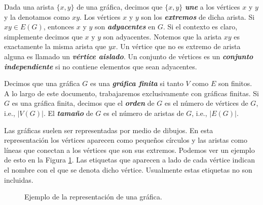 Dada una arista $\{x,y\}$ de una gráfica, decimos que $\{x,y\}$ \textbf{\emph{une}} a los vértices $x$ y $y$ y la denotamos como $xy$. Los vértices $x$ y $y$ son los \textbf{\emph{extremos}} de dicha arista. Si $xy \in E(G)$, entonces $x$ y $y$ son \textbf{\emph{adyacentes}} en $G$. Si el contexto es claro, simplemente decimos que $x$ y $y$ son adyacentes. Notemos que la arista $xy$ es exactamente la misma arista que $yx$. Un vértice que no es extremo de arista alguna es llamado un \textbf{\emph{vértice aislado}}. Un conjunto de vértices es un \textbf{\emph{conjunto independiente}} si no contiene elementos que sean adyacentes.

Decimos que una gráfica $G$ es una \textbf{\textit{gráfica finita}} si tanto $V$ como $E$ son finitos. A lo largo de este documento, trabajaremos exclusivamente con gráficas finitas. Si $G$ es una gráfica finita, decimos que el \textbf{\emph{orden}} de $G$ es el número de vértices de $G$, i.e., $|V(G)|$. El \textbf{\emph{tamaño}} de $G$ es el número de aristas de $G$, i.e., $|E(G)|$.

Las gráficas suelen ser representadas por medio de dibujos. En esta representación los vértices aparecen como pequeños círculos y las aristas como líneas que conectan a los vértices que son sus extremos. Podemos ver un ejemplo de esto en la Figura \ref{fig_ejemplo_graph}. Las etiquetas que aparecen a lado de cada vértice indican el nombre con el que se denota dicho vértice. Usualmente estas etiquetas no son incluidas.

\begin{figure}[ht!]
\begin{center}
\end{center}
\caption{Ejemplo de la representación de una gráfica.}\label{fig_ejemplo_graph}
\end{figure}


